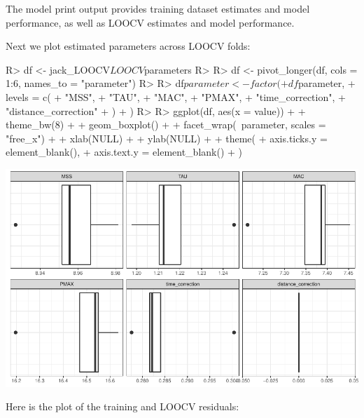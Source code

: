 \documentclass[
]{jss}
\begin{document}
The model print output provides training dataset estimates and model performance, as well as LOOCV estimates and model performance.

Next we plot estimated parameters across LOOCV folds:

\begin{CodeChunk}
\begin{CodeInput}
R> df <- jack_LOOCV$LOOCV$parameters
R> 
R> df <- pivot_longer(df, cols = 1:6, names_to = "parameter")
R> 
R> df$parameter <- factor(
+   df$parameter,
+   levels = c(
+     "MSS",
+     "TAU",
+     "MAC",
+     "PMAX",
+     "time_correction",
+     "distance_correction"
+   )
+ )
R> 
R> ggplot(df, aes(x = value)) +
+   theme_bw(8) +
+   geom_boxplot() +
+   facet_wrap(~parameter, scales = "free_x") +
+   xlab(NULL) +
+   ylab(NULL) +
+   theme(
+     axis.ticks.y = element_blank(),
+     axis.text.y = element_blank()
+   )
\end{CodeInput}


\begin{center}\includegraphics[width=1\linewidth]{paper_files/figure-latex/unnamed-chunk-49-1} \end{center}

\end{CodeChunk}

Here is the plot of the training and LOOCV residuals:
\end{document}
